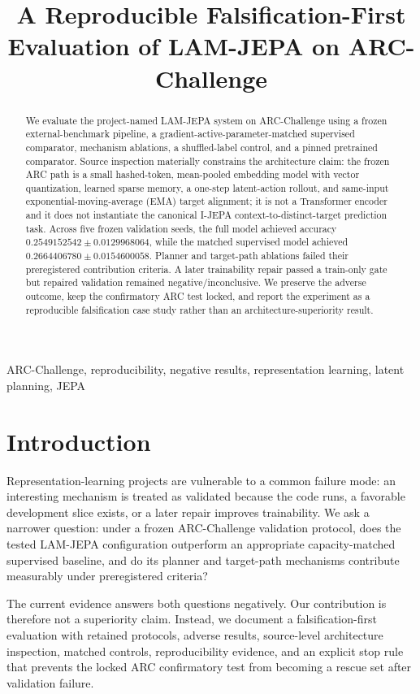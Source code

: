 \documentclass[conference]{IEEEtran}
\title{A Reproducible Falsification-First Evaluation of LAM-JEPA on ARC-Challenge}
\author{\IEEEauthorblockN{AUTHOR METADATA PENDING OWNER APPROVAL}
\IEEEauthorblockA{High School Student affiliation must be inserted before submission}}
\begin{document}
\maketitle

\begin{abstract}
We evaluate the project-named LAM-JEPA system on ARC-Challenge using a frozen external-benchmark pipeline, a gradient-active-parameter-matched supervised comparator, mechanism ablations, a shuffled-label control, and a pinned pretrained comparator. Source inspection materially constrains the architecture claim: the frozen ARC path is a small hashed-token, mean-pooled embedding model with vector quantization, learned sparse memory, a one-step latent-action rollout, and same-input exponential-moving-average (EMA) target alignment; it is not a Transformer encoder and it does not instantiate the canonical I-JEPA context-to-distinct-target prediction task. Across five frozen validation seeds, the full model achieved accuracy $0.2549152542\pm0.0129968064$, while the matched supervised model achieved $0.2664406780\pm0.0154600058$. Planner and target-path ablations failed their preregistered contribution criteria. A later trainability repair passed a train-only gate but repaired validation remained negative/inconclusive. We preserve the adverse outcome, keep the confirmatory ARC test locked, and report the experiment as a reproducible falsification case study rather than an architecture-superiority result.
\end{abstract}

\begin{IEEEkeywords}
ARC-Challenge, reproducibility, negative results, representation learning, latent planning, JEPA
\end{IEEEkeywords}

\section{Introduction}
Representation-learning projects are vulnerable to a common failure mode: an interesting mechanism is treated as validated because the code runs, a favorable development slice exists, or a later repair improves trainability. We ask a narrower question: under a frozen ARC-Challenge validation protocol, does the tested LAM-JEPA configuration outperform an appropriate capacity-matched supervised baseline, and do its planner and target-path mechanisms contribute measurably under preregistered criteria?

The current evidence answers both questions negatively. Our contribution is therefore not a superiority claim. Instead, we document a falsification-first evaluation with retained protocols, adverse results, source-level architecture inspection, matched controls, reproducibility evidence, and an explicit stop rule that prevents the locked ARC confirmatory test from becoming a rescue set after validation failure.
\end{document}
